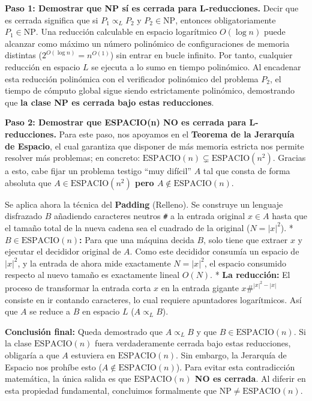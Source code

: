 \documentclass[12pt]{book} %
\begin{document}
\textbf{Paso 1: Demostrar que NP sí es cerrada para L-reducciones.}
Decir que es cerrada significa que si \(P_1 \propto_L P_2\) y
\(P_2 \in \text{NP}\), entonces obligatoriamente \(P_1 \in \text{NP}\).
Una reducción calculable en espacio logarítmico \(O(\log n)\) puede
alcanzar como máximo un número polinómico de configuraciones de memoria
distintas (\(2^{O(\log n)} = n^{O(1)}\)) sin entrar en bucle infinito.
Por tanto, cualquier reducción en espacio \(L\) se ejecuta a lo sumo en
tiempo polinómico. Al encadenar esta reducción polinómica con el
verificador polinómico del problema \(P_2\), el tiempo de cómputo global
sigue siendo estrictamente polinómico, demostrando que \textbf{la clase
NP es cerrada bajo estas reducciones}.

\textbf{Paso 2: Demostrar que ESPACIO(n) NO es cerrada para
L-reducciones.} Para este paso, nos apoyamos en el \textbf{Teorema de la
Jerarquía de Espacio}, el cual garantiza que disponer de más memoria
estricta nos permite resolver más problemas; en concreto:
\(\text{ESPACIO}(n) \subsetneq \text{ESPACIO}(n^2)\). Gracias a esto,
cabe fijar un problema testigo ``muy difícil'' \(A\) tal que consta de
forma absoluta que \textbf{\(A \in \text{ESPACIO}(n^2)\) pero
\(A \notin \text{ESPACIO}(n)\)}.

Se aplica ahora la técnica del \textbf{Padding} (Relleno). Se construye
un lenguaje disfrazado \(B\) añadiendo caracteres neutros \texttt{\#} a
la entrada original \(x \in A\) hasta que el tamaño total de la nueva
cadena sea el cuadrado de la original (\(N = |x|^2\)). *
\textbf{\(B \in \text{ESPACIO}(n)\):} Para que una máquina decida \(B\),
solo tiene que extraer \(x\) y ejecutar el decididor original de \(A\).
Como este decididor consumía un espacio de \(|x|^2\), y la entrada de
ahora mide exactamente \(N = |x|^2\), el espacio consumido respecto al
nuevo tamaño es exactamente lineal \(O(N)\). * \textbf{La reducción:} El
proceso de transformar la entrada corta \(x\) en la entrada gigante
\(x\#^{|x|^2 - |x|}\) consiste en ir contando caracteres, lo cual
requiere apuntadores logarítmicos. Así que \(A\) se reduce a \(B\) en
espacio \(L\) (\(A \propto_L B\)).

\textbf{Conclusión final:} Queda demostrado que \(A \propto_L B\) y que
\(B \in \text{ESPACIO}(n)\). Si la clase \(\text{ESPACIO}(n)\) fuera
verdaderamente cerrada bajo estas reducciones, obligaría a que \(A\)
estuviera en \(\text{ESPACIO}(n)\). Sin embargo, la Jerarquía de Espacio
nos prohíbe esto (\(A \notin \text{ESPACIO}(n)\)). Para evitar esta
contradicción matemática, la única salida es que
\textbf{\(\text{ESPACIO}(n)\) NO es cerrada}. Al diferir en esta
propiedad fundamental, concluimos formalmente que
\textbf{\(\text{NP} \neq \text{ESPACIO}(n)\)}.
\end{document}
